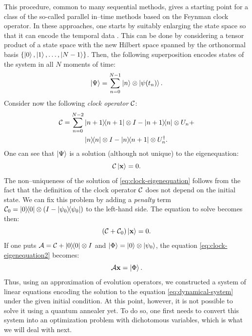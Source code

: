 This procedure, common to many sequential methods, gives a starting point for a
class of the so-called parallel in--time methods based on the Feynman clock
operator. In these approaches, one starts by suitably enlarging the state space
so that it can encode the temporal data \cite{feynmanclock}. This can be done
by considering a tensor product of a state space with the new Hilbert space
spanned by the orthonormal basis $\{\ket{0}, \ket{1}, \ldots, \ket{N-1}\}$.
Then, the following superposition encodes states of the system in all $N$
moments of time:
%
\begin{equation}
  \ket{\Psi} = \sum_{n=0}^{N-1} \ket{n} \otimes \ket{\psi(t_n)}.
\end{equation}
Consider now the following \emph{clock operator} $\mathcal{C}$:
\begin{equation}
  \label{eq:clock2}
  \begin{split}
    \mathcal{C}
    =
    \sum_{n=0}^{N-2}
    &\ketbra{n+1}{n+1} \otimes I - \ketbra{n+1}{n} \otimes U_n + \\
    &\ketbra{n}{n} \otimes I - \ketbra{n}{n+1}\otimes U_{n}^{\dagger}.
  \end{split}
\end{equation}
One can see that $\ket{\Psi}$ is a solution (although not unique) to the
eigenequation:
\begin{equation}
  \label{eq:clock-eigenequation}
  \mathcal{C} \ket{\mathbf{x}} = 0.
\end{equation}
The non--uniqueness of the solution of \eqref{eq:clock-eigenequation} follows
from the fact that the definition of the clock operator $\mathcal{C}$ does not
depend on the initial state. We can fix this problem by adding a \emph{penalty}
term $\mathcal{C}_0 = \ketbra{0}{0}\otimes(I-\ketbra{\psi_0}{\psi_0})$ to the
left-hand side. The equation to solve becomes then:
\begin{equation}
  \label{eq:clock-eigenequation2}
  (\mathcal{C} + \mathcal{C}_0) \ket{\mathbf{x}} = 0.
\end{equation}
If one puts $\mathcal{A}=\mathcal{C} + \ketbra{0}{0} \otimes I$ and $\ket{\Phi} =
  \ket{0}\otimes \ket{\psi_0}$, the equation \eqref{eq:clock-eigenequation2}
becomes:
\begin{equation}
  \label{eq:gsys}
  \mathcal{A} \mathbf{x} = \ket{\Phi}.
\end{equation}
Thus, using an approximation of evolution operators, we constructed a system of
linear equations encoding the solution to the equation
\eqref{eq:dynamical-system} under the given initial condition. At this point,
however, it is not possible to solve it using a quantum annealer yet. To do so,
one first needs to convert this system into an optimization problem with
dichotomous variables, which is what we will deal with next.
